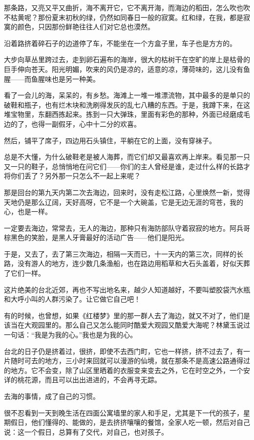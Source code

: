 \par 那条路，又亮又平又曲折，海不离开它，它不离开海，而海边的稻田，怎么吹也吹不枯黄呢？那份夏末初秋的绿，仍然如同春日一般的寂寞。红和绿，在我，都是寂寞的颜色，只因那份鲜艳往往人们对它总也漠然。
\par 沿着路挤着碎石子的边道停了车，不能坐在一个方盒子里，车子也是方方的。
\par 大步向草丛里跨过去，走到卵石遍布的海岸，很大的枯树干在空旷的岸上是枯骨的巨手伸向苍天。阳光明媚，吹来的风仍是凉的，适意的凉，薄荷味的，这儿没有鱼腥——而鱼腥味也是另一种美。
\par 看了一会儿的海，呆呆的，有乡愁。海滩上一堆一堆漂流物，其中最多的是单只的破鞋和瓶子，也有烂木块和洗刷得发灰的乱七八糟的东西。于是，我蹲下来，在这堆宝物里，东翻西拣起来。拣到一只大弹珠，里面有彩色的那种，外面已经磨成毛边的了，也得一副假牙，心中十二分的欢喜。
\par 然后，铺平了席子，四边用石头镇住，平躺在它的上面，没有穿袜子。
\par 总是不大懂，为什么破鞋老是被人海葬，而它们却又最喜欢再上岸来。看见那一只又一只的鞋子，总悄悄地在问它们——你们的主人曾经是谁，走过什么样的长路才将你们丢了？另外那一只怎么不一起上来呢？
\par 那是回台的第九天内第二次去海边，回来时，没有走松江路，心里焕然一新，觉得天地仍是那么辽阔，天好高呀，它不是一个大碗盖，它是无边无涯的穹苍，我的心，也是一样。
\par 一定要去海边，常常去，无人的海边，那种只有海防部队守着寂寂的地方。阿兵哥棕黑色的笑脸，是黑人牙膏最好的活动广告——他们是阳光。
\par 于是，又去了，去了第三次海边，相隔一天而已，十一天内的第三次，同样的长路，没有游人的地方，连少数几条渔船，也在路边用稻草和大石头盖着，好似天葬了它们一样。
\par 这片绝美的台北近郊，再也不写出地名来，越少人知道越好，不要叫塑胶袋汽水瓶和大呼小叫的人群污染了。让它做它自己吧！
\par 有的时候，也曾想，如果《红楼梦》里的那一群人去了海边，就又不对了，他们是该当在大观园里的。那么自己又怎么能同时酷爱大观园又酷爱大海呢？林黛玉说过一句话：“我是为我的心。”我也是为我的心。
\par 台北的日子仍是挤着过，很挤，即使不去西门町，它也一样挤，挤不过去了，有一片随时可去的地方，三小时来回就可以漫游的仙境，就在那条不是高速公路通得过的地方。它不会变，除了山区里晒着的衣服变来变去之外，它在时空之外，一个安详的桃花源，而且可以出出进进的，不会再寻无踪。
\par 去海的事情，成了自己的习惯。
\par 很不忍看到一天到晚生活在四面公寓墙里的家人和手足，尤其是下一代的孩子，星期假日，他们懂得的、能做的，是去挤挤嚷嚷的餐馆，全家人吃一顿，然后对自己说：这一个假日，总算有了交代，对自己，也对孩子。
